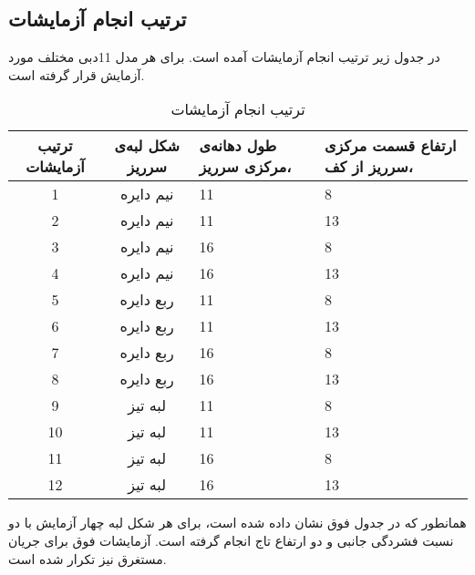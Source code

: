 \subsection{ترتیب انجام آزمایشات}
در جدول زیر ترتیب انجام آزمایشات آمده است. برای هر مدل 11دبی مختلف مورد آزمایش قرار گرفته است.\\
\begin{table}[h]
\caption {ترتیب انجام آزمایشات } \label{table4.2} 
\centering
\begin{tabular}{ | c | c | P{3cm} | P{3cm} | }
\hline
{}
ترتیب آزمایشات      &	شکل لبه‌ی سرریز&	  طول دهانه‌ی مرکزی سرریز،  &	ارتفاع قسمت مرکزی سرریز از کف، \\
\hline{}
1     &	نیم دایره     &	11  &	8\\  
2     &	 نیم دایره   &	11    &	13\\
\hline{}
3     &	نیم دایره     &	16   &	8\\
\hline{}
4    &	نیم دایره    &	16  &	13\\
\hline{}
  5   &	 ربع دایره    &	11  &	8\\
\hline{}
   6  &	 ربع دایره   &	11	& 13\\
\hline{}
7   &	ربع دایره    &	16  &	8\\
\hline{}
8   &	ربع دایره    &	16   &	13\\
\hline{}
9    &	لبه تیز &	11  &	8\\
\hline{}
10  &	لبه تیز   &	  11  &	13\\
\hline{}
11  &	لبه تیز  &	16  &	8\\
\hline{}
12  &	لبه تیز  &	16 &	13\\
\hline
 \end{tabular}
\end{table}
\newline
همانطور که در جدول فوق نشان داده شده است، برای هر شکل لبه چهار آزمایش با دو نسبت فشردگی جانبی و دو ارتفاع تاج انجام گرفته است. آزمایشات فوق برای جریان مستغرق نیز تکرار شده است.










